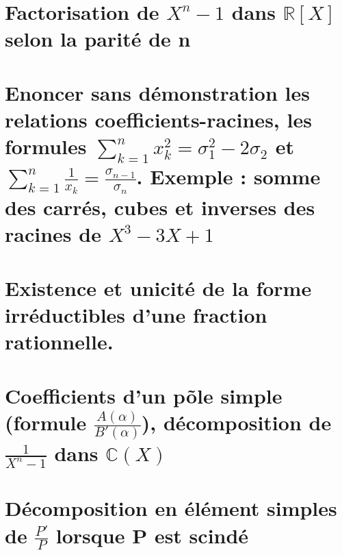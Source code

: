 \documentclass{article}
\begin{document}
\section{Factorisation de $X^n-1$ dans $\mathbb R [X]$ selon la parité de n}
\section{Enoncer sans démonstration les relations coefficients-racines, les formules $\sum_{k=1}^n x_k^2= \sigma_1^2-2 \sigma_2$ et $\sum_{k=1}^n \frac{1}{x_k}=\frac{\sigma_{n-1}}{\sigma_{n}}$. Exemple : somme des carrés, cubes et inverses des racines de $X^3-3X+1$}
\section{Existence et unicité de la forme irréductibles d'une fraction rationnelle.}
\section{Coefficients d'un põle simple (formule $\frac{A(\alpha)}{B'(\alpha)}$), décomposition de $\frac{1}{X^n-1}$ dans $\mathbb{C}(X)$}
\section{Décomposition en élément simples de $\frac{P'}{P}$ lorsque P est scindé}
\end{document}
